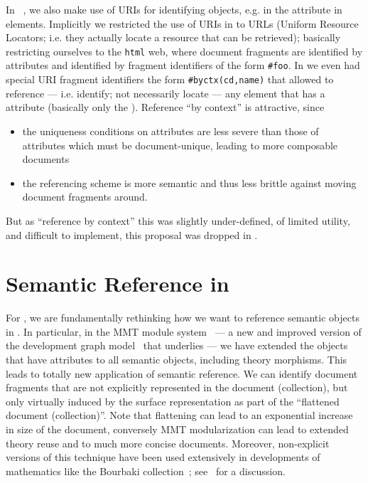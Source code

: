 \documentclass[12pt]{article}
\begin{document}
In {}~\cite{Kohlhase:omdoc1.2}, we also make use of URIs for identifying
objects, e.g. in the {} attribute in {}
elements. Implicitly we restricted the use of URIs in {} to URLs (Uniform
Resource Locators; i.e. they actually locate a resource that can be retrieved); basically
restricting ourselves to the {\texttt{html}} web, where document fragments are identified
by {} attributes and identified by fragment identifiers of
the form {\texttt{\#foo}}.  In {} we even had special URI fragment identifiers
the form {\texttt{\#byctx(cd,name)}} that allowed to reference --- i.e. identify; not
necessarily locate --- any {\omdoc} element that has a {} attribute
(basically only the {}). Reference ``by context'' is attractive, since
\begin{itemize}
\item the uniqueness conditions on {} attributes are less severe than
  those of {} attributes which must be document-unique,
  leading to more composable documents
\item the referencing scheme is more semantic and thus less brittle against moving
  document fragments around.
\end{itemize}
But as ``reference by context'' this was slightly under-defined, of limited utility, and
difficult to implement, this proposal was dropped in {}.

\section{Semantic Reference in {}} 

For {}, we are fundamentally rethinking how we want to reference semantic
objects in {\omdoc}. In particular, in the MMT module system~\cite{RabKoh:WSMSML08} --- a
new and improved version of the development graph model~\cite{MosAutHut:edgwh01} that
underlies {} --- we have extended the objects that have
{} attributes to all semantic objects, including theory
morphisms. This leads to totally new application of semantic reference. We can identify
{\omdoc} document fragments that are not explicitly represented in the {\omdoc} document
(collection), but only virtually induced by the surface representation as part of the
``flattened document (collection)''. Note that flattening can lead to an exponential
increase in size of the document, conversely MMT modularization can lead to extended
theory reuse and to much more concise documents. Moreover, non-explicit versions of this
technique have been used extensively in developments of mathematics like the Bourbaki
collection~\cite{Bourbaki:a68,Bourbaki:a74}; see~\cite{Laubner:utgmm07} for a discussion.
\end{document}
